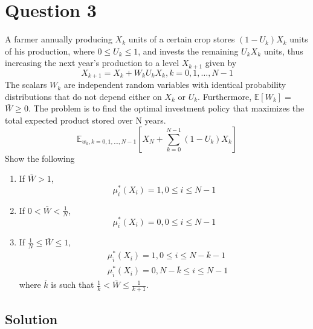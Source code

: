 \section*{Question 3}

A farmer annually producing \( X_{k} \) units of a certain crop stores \( \left(1-U_{k}\right) X_{k} \) units of his production, where \( 0 \leq U_{k} \leq 1 \), and invests the remaining \( U_{k} X_{k} \) units, thus increasing the next year's production to a level \( X_{k+1} \) given by
\[
    X_{k+1} = X_{k}+W_{k} U_{k} X_{k}, k = 0,1, \dots, N-1
\]
The scalars \( W_{k} \) are independent random variables with identical probability distributions that do not depend either on \( X_{k} \) or \( U_{k} \).
Furthermore, \( \mathbb{E}\left[W_{k}\right]= \) \( \bar{W} \geq 0 \).
The problem is to find the optimal investment policy that maximizes the total expected product stored over N years.
\[
    \mathbb{E}_{w_{k}, k = 0,1,\dots, N-1}\left[X_{N}+\sum_{k = 0}^{N-1}\left(1-U_{k}\right) X_{k}\right]
\]
Show the following
\begin{enumerate}[noitemsep, label= (\alph*)]
    \item If \( \bar{W}>1 \),
          \[
              \mu_{i}^{*}\left(X_{i}\right) = 1,0 \leq i \leq N-1
          \]

    \item If \( 0<\bar{W}<\frac{1}{N} \),
          \[
              \mu_{i}^{*}\left(X_{i}\right) = 0,0 \leq i \leq N-1
          \]

    \item If \( \frac{1}{N} \leq \bar{W} \leq 1 \),
          \[
              \begin{aligned}
                   & \mu_{i}^{*}\left(X_{i}\right) = 1,0 \leq i \leq N-\bar{k}-1  \\
                   & \mu_{i}^{*}\left(X_{i}\right) = 0, N-\bar{k} \leq i \leq N-1
              \end{aligned}
          \]
          where \( \bar{k} \) is such that \( \frac{1}{k}<\bar{W} \leq \frac{1}{k+1} \).
\end{enumerate}

\subsection*{Solution}

